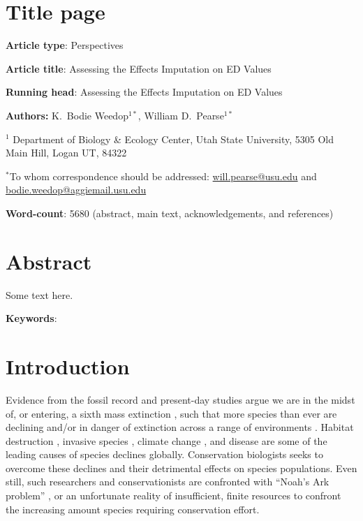 \documentclass[12pt,english]{article}
\begin{document}
\setlength{\parindent}{0pt}
\section*{Title page}
\textbf{Article type}: Perspectives

\textbf{Article title}: Assessing the Effects Imputation on ED Values

\textbf{Running head}: Assessing the Effects Imputation on ED Values

\textbf{Authors:} K.\ Bodie Weedop$^{1*}$, William D.\ Pearse$^{1*}$\

$^1$ Department of Biology \& Ecology Center, Utah State University,
5305 Old Main Hill, Logan UT, 84322

$^*$To whom correspondence should be addressed:
\url{will.pearse@usu.edu} and \url{bodie.weedop@aggiemail.usu.edu}

\textbf{Word-count}: 5680 (abstract, main text, acknowledgements, and references)

\clearpage
\section*{Abstract}

Some text here.

\textbf{Keywords}: 

\clearpage
\section*{Introduction}
Evidence from the fossil record and present-day studies argue we are
in the midst of, or entering, a sixth mass extinction \autocite{Barnosky2011; ceballos2015accelerated}, such that more species than ever are
declining and/or in danger of extinction across a range of
environments \autocite{wake2008we,thomas2004extinction}. Habitat destruction
\autocite{Brooks2002}, invasive species
\autocite{Molnar2008}, climate change
\autocite{Pounds2006}, and disease \autocite{Lips2006} are some of
the leading causes of species declines globally. Conservation
biologists seeks to overcome these declines and their detrimental
effects on species populations. Even still, such researchers and
conservationists are confronted with ``Noah's Ark problem''
\autocite{Weitzman1998}, or an unfortunate reality of insufficient,
finite resources to confront the increasing amount species requiring
conservation effort.
\end{document}
